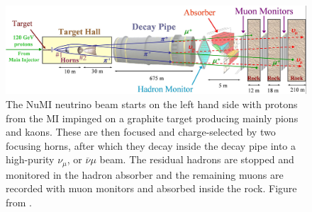 \begin{figure}[!hbtp]
\centering
\includegraphics[width=\textwidth]{Plots/NOvAExperiment/BeamlineAlternative.jpg}
\caption[The schematic of the NuMI beam facility]{
The \acrshort{NuMI} neutrino beam starts on the left hand side with protons from the \acrshort{MI} impinged on a graphite target producing mainly pions and kaons. These are then focused and charge-selected by two focusing horns, after which they decay inside the decay pipe into a high-purity $\nu_\mu$, or $\overline{\nu}\mu$ beam. The residual hadrons are stopped and monitored in the hadron absorber and the remaining muons are recorded with muon monitors and absorbed inside the rock. Figure from \cite{NuMI.pdf}.
}
\label{fig:NOvANuMI}
\end{figure}

